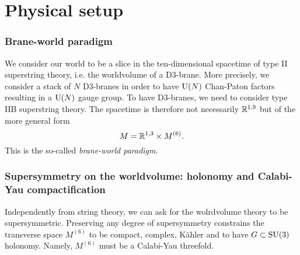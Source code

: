 \section{Physical setup}

    \subsubsection*{Brane-world paradigm}

        We consider our world to be a slice in the ten-dimensional spacetime of type II superstring theory, i.e. the worldvolume of a D$3$-brane. More precisely, we consider a stack of $N$ D$3$-branes in order to have $\text{U}(N)$ Chan-Paton factors resulting in a $\text{U}(N)$ gauge group. To have D$3$-branes, we need to consider type IIB superstring theory. The spacetime is therefore not necessarily $\mathbb{R}^{1,9}$ but of the more general form
        \begin{equation*}
            M = \mathbb{R}^{1,3}\times M^{(6)}.
        \end{equation*}
        This is the so-called \emph{brane-world paradigm}. %

    \subsubsection*{Supersymmetry on the worldvolume: holonomy and Calabi-Yau compactification}
    
        Independently from string theory, we can ask for the wolrdvolume theory to be supersymmetric. Preserving any degree of supersymmetry constrains the transverse space $M^{(6)}$ to be compact, complex, Kähler and to have $G\subset\text{SU}(3)$ holonomy. Namely, $M^{(6)}$ must be a Calabi-Yau threefold.

